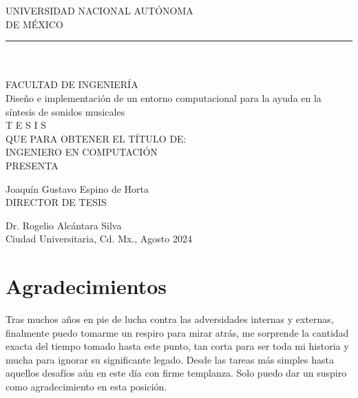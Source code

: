 \documentclass{book}
\begin{document}
	\begin{minipage}{.7\textwidth}
		\begin{flushright}
				\begin{center}
				\begin{center}
					\LARGE{U}\large{NIVERSIDAD} \LARGE{N}\large{ACIONAL} 
					\LARGE{A}\large{UTÓNOMA} \\[10pt]
					\large{DE} 
					\LARGE{M}\large{ÉXICO} 
				\end{center}
				\rule{\textwidth}{2pt}
				\\
				\hrulefill\\[1cm]
				
				\LARGE{F}\large{ACULTAD DE } \LARGE{I}\large{NGENIERÍA}\\[2cm]
				
				\large{Diseño e implementación de un entorno computacional para la ayuda en la síntesis de sonidos musicales}\\[1.5cm]
				
				\huge{T E S I S }\\[1.5cm]
				
				\large{QUE PARA OBTENER EL TÍTULO DE:}\\[1cm]
				
				\large{INGENIERO EN COMPUTACIÓN}\\[1cm]
				
				\large{PRESENTA}
				
				\large{Joaquín Gustavo Espino de Horta}\\[1cm]
				
				\large{DIRECTOR DE TESIS}
				
				\large{Dr. Rogelio Alcántara Silva}\\[1cm]
				
				\large{Ciudad Universitaria, Cd. Mx., Agosto 2024}
				
			\end{center}
		\end{flushright}
	\end{minipage}
	
	\section*{Agradecimientos}
	Tras muchos años en pie de lucha contra las adversidades internas y externas, finalmente puedo tomarme un respiro para mirar atrás, me sorprende la cantidad exacta del tiempo tomado hasta este punto, tan corta para ser toda mi historia y mucha para ignorar su significante legado. Desde las tareas más simples hasta aquellos desafíos aún en este día con firme templanza. Solo puedo dar un suspiro como agradecimiento en esta posición.\par 
	
\end{document}
